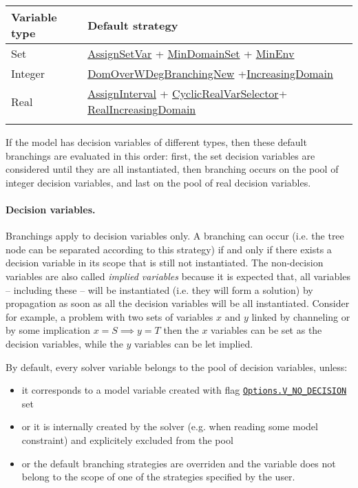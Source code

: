 \noindent\begin{tabular}{p{.25\linewidth}p{.7\linewidth}}
\hline
Variable type &  Default strategy \\
\hline
Set &   \hyperlink{assignsetvar:assignsetvarbranchstrat}{AssignSetVar} + \hyperlink{mindomset:mindomsetvarselector}{MinDomainSet} + \hyperlink{minenv:minenvvalselector}{MinEnv} \\
Integer & \hyperlink{domoverwdeg:domoverwdegbranchstrat}{DomOverWDegBranchingNew} +\hyperlink{increasingdomain:increasingdomainvaliterator}{IncreasingDomain}\\
 Real &  \hyperlink{assigninterval:assignintervalbranchstrat}{AssignInterval} + \hyperlink{cyclicrealvarselector:cyclicrealvarselectorvarselector}{CyclicRealVarSelector}+ \hyperlink{realincreasingdomain:realincreasingdomainvaliterator}{RealIncreasingDomain} \\
\hline\\
\end{tabular}
If the model has decision variables of different types, then these default branchings are evaluated in this order: first, the set decision variables are considered until they are all instantiated, then branching occurs on the pool of integer decision variables, and last on the pool of real decision variables.

\paragraph{Decision variables.}
Branchings apply to decision variables only. A branching can occur (i.e. the tree node can be separated according to this strategy) if and only if there exists a decision variable in its scope that is still not instantiated.
The non-decision variables are also called \emph{implied variables} because it is expected that, all variables -- including these -- will be instantiated (i.e. they will form a solution) by propagation as soon as all the decision variables will be all instantiated. Consider for example, a problem with two sets of variables $x$ and $y$ linked by channeling or by some implication $x=S\implies y=T$ then the $x$ variables can be set as the decision variables, while the $y$ variables can be let implied. 

By default, every solver variable belongs to the pool of decision variables, unless:
\begin{itemize}
\item it corresponds to a model variable created with flag \hyperlink{vnodecision:vnodecisionoptions}{\tt Options.V\_NO\_DECISION} set
\item or it is internally created by the solver (e.g. when reading some model constraint) and explicitely excluded from the pool
\item or the default branching strategies are overriden and the variable does not belong to the scope of one of the strategies specified by the user.
\end{itemize}

